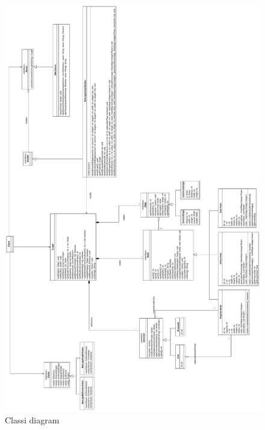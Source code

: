 \begin{figure}[htbp]
\centering
\includegraphics[width=\textwidth,height=\textheight,keepaspectratio]{images/complete-diagram.pdf}
\caption{Classi diagram}
\label{fig:complete-diagram}
\end{figure}